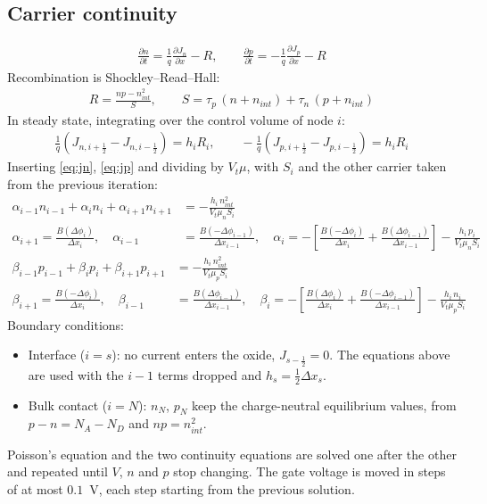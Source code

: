 \documentclass[11pt]{article}
\newcommand{\dphi}[1]{\Delta\phi_{#1}}
\newcommand{\half}{\tfrac{1}{2}}
\begin{document}
\subsection{Carrier continuity}
\begin{align}
\frac{\partial n}{\partial t}=\frac1q\frac{\partial J_n}{\partial x}-R,\qquad
\frac{\partial p}{\partial t}=-\frac1q\frac{\partial J_p}{\partial x}-R \label{eq:continuity}
\end{align}
Recombination is Shockley--Read--Hall:
\begin{align}
R=\frac{np-n_{int}^2}{S},\qquad S=\tau_p\,(n+n_{int})+\tau_n\,(p+n_{int}) \label{eq:srh}
\end{align}
In steady state, integrating over the control volume of node $i$:
\begin{align}
\frac1q\left(J_{n,i+\half}-J_{n,i-\half}\right)=h_iR_i,\qquad
-\frac1q\left(J_{p,i+\half}-J_{p,i-\half}\right)=h_iR_i
\end{align}
Inserting \eqref{eq:jn}, \eqref{eq:jp} and dividing by $V_t\mu$, with $S_i$ and the other carrier taken
from the previous iteration:
\begin{align}
\alpha_{i-1}n_{i-1}+\alpha_in_i+\alpha_{i+1}n_{i+1} &= -\frac{h_i\,n_{int}^2}{V_t\mu_nS_i}\\
\alpha_{i+1}=\frac{B(\dphi{i})}{\Delta x_i},\quad
\alpha_{i-1}&=\frac{B(-\dphi{i-1})}{\Delta x_{i-1}},\quad
\alpha_i=-\left[\frac{B(-\dphi{i})}{\Delta x_i}+\frac{B(\dphi{i-1})}{\Delta x_{i-1}}\right]-\frac{h_i\,p_i}{V_t\mu_nS_i}
\end{align}
\begin{align}
\beta_{i-1}p_{i-1}+\beta_ip_i+\beta_{i+1}p_{i+1} &= -\frac{h_i\,n_{int}^2}{V_t\mu_pS_i}\\
\beta_{i+1}=\frac{B(-\dphi{i})}{\Delta x_i},\quad
\beta_{i-1}&=\frac{B(\dphi{i-1})}{\Delta x_{i-1}},\quad
\beta_i=-\left[\frac{B(\dphi{i})}{\Delta x_i}+\frac{B(-\dphi{i-1})}{\Delta x_{i-1}}\right]-\frac{h_i\,n_i}{V_t\mu_pS_i}
\end{align}
Boundary conditions:
\begin{itemize}
\item Interface ($i=s$): no current enters the oxide, $J_{s-\half}=0$. The equations above are used with the
$i-1$ terms dropped and $h_s=\half\Delta x_s$.
\item Bulk contact ($i=N$): $n_N$, $p_N$ keep the charge-neutral equilibrium values, from
$p-n=N_A-N_D$ and $np=n_{int}^2$.
\end{itemize}
Poisson's equation and the two continuity equations are solved one after the other and repeated until
$V$, $n$ and $p$ stop changing. The gate voltage is moved in steps of at most $0.1$~V, each step starting
from the previous solution.
\end{document}
